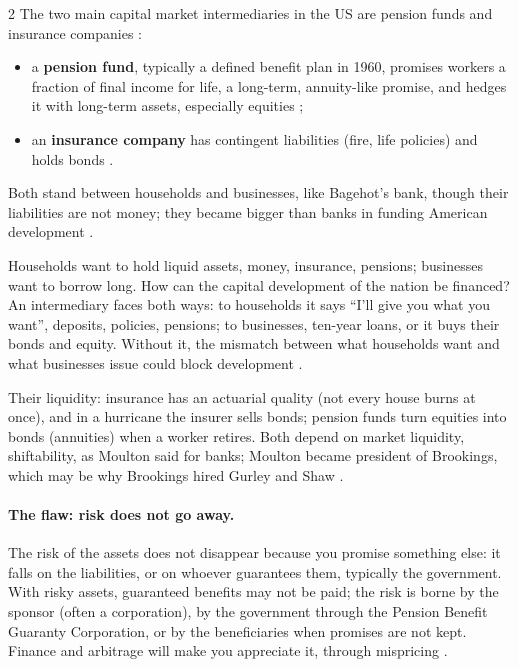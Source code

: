 \begin{paracol}{2}
The two main capital market intermediaries in the US are pension funds and insurance companies :
\begin{itemize}
  \item a \textbf{pension fund}, typically a defined benefit plan in 1960, promises workers a fraction of final income for life, a long-term, annuity-like promise,
        and hedges it with long-term assets, especially equities ;
  \item an \textbf{insurance company} has contingent liabilities (fire, life policies) and holds bonds .
\end{itemize}
Both stand between households and businesses, like Bagehot's bank, though their liabilities are not money; they became bigger than banks in funding American
development .

\begin{intuition}
Households want to hold liquid assets, money, insurance, pensions; businesses want to borrow long. How can the capital development of the nation be financed?
An intermediary faces both ways: to households it says ``I'll give you what you want'', deposits, policies, pensions; to businesses, ten-year loans, or it buys
their bonds and equity. Without it, the mismatch between what households want and what businesses issue could block development
.
\end{intuition}

Their liquidity: insurance has an actuarial quality (not every house burns at once), and in a hurricane the insurer sells bonds; pension funds turn equities into
bonds (annuities) when a worker retires. Both depend on market liquidity, shiftability, as Moulton said for banks; Moulton became president of Brookings, which
may be why Brookings hired Gurley and Shaw .

\paragraph{The flaw: risk does not go away.} The risk of the assets does not disappear because you promise something else: it falls on the liabilities, or on
whoever guarantees them, typically the government. With risky assets, guaranteed benefits may not be paid; the risk is borne by the sponsor (often a corporation),
by the government through the Pension Benefit Guaranty Corporation, or by the beneficiaries when promises are not kept. Finance and arbitrage will make you
appreciate it, through mispricing .


\end{paracol}
